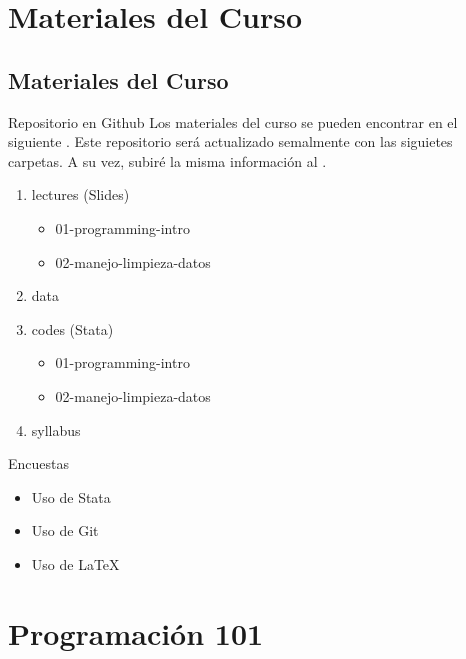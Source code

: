 \documentclass[11pt, aspectratio=169, compress]{beamer}
\begin{document}
\section{Materiales del Curso}
\subsection{Materiales del Curso}
\begin{frame}{Repositorio en Github}
	Los materiales del curso se pueden encontrar en el siguiente \href{https://github.com/lambda-stata/course-materials}{\color{blue}{enlace}}. Este repositorio será actualizado semalmente con las siguietes carpetas. A su vez, subiré la misma información al \href{https://aulavirtual.grupolambda.com.pe/index/curso/id/5427}{\color{blue}{Aula Virtual}}. 
	\begin{enumerate}
		\item lectures (Slides)
		\begin{itemize}
			\item 01-programming-intro
			\item 02-manejo-limpieza-datos
		\end{itemize}
		\item data
		\item codes (Stata)
		\begin{itemize}
			\item 01-programming-intro
			\item 02-manejo-limpieza-datos
		\end{itemize} 
		\item syllabus
	\end{enumerate}
\end{frame}
\begin{frame}{Encuestas}
	\begin{itemize}
		\item Uso de Stata
		\item Uso de Git
		\item Uso de \LaTeX
	\end{itemize}
\end{frame}
\section{Programación 101}
\end{document}

